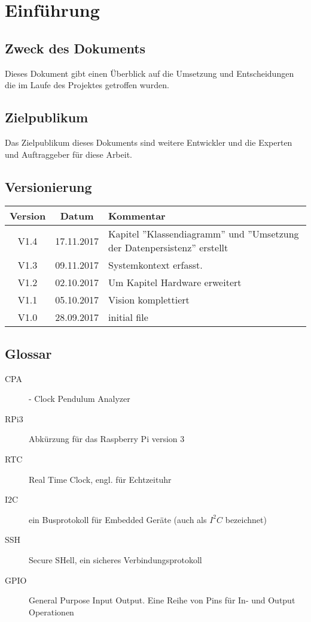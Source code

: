 \section{Einführung}
		\subsection{Zweck des Dokuments}
            Dieses Dokument gibt einen Überblick auf die Umsetzung und Entscheidungen die im Laufe des Projektes getroffen wurden.
		\subsection{Zielpublikum}
            Das Zielpublikum dieses Dokuments sind weitere Entwickler und die Experten und Auftraggeber für diese Arbeit.
		\subsection{Versionierung}
			\begin{table}[h]
				\centering
				\begin{tabularx}{\textwidth}{|c|c|X|}
				\hline
				\rowcolor{shadecolor}\textbf{Version} & \textbf{Datum} & \textbf{Kommentar}\\ \hline
                V1.4 & 17.11.2017 & Kapitel ''Klassendiagramm'' und ''Umsetzung der Datenpersistenz'' erstellt\\ \hline
                V1.3 & 09.11.2017 & Systemkontext erfasst.\\ \hline
                V1.2 & 02.10.2017 & Um Kapitel Hardware erweitert \\ \hline
        		V1.1 & 05.10.2017 & Vision komplettiert \\ \hline
				V1.0 & 28.09.2017 & initial file \\ \hline
				\end{tabularx}
			\end{table}
		\subsection{Glossar}
			\begin{description}
				\item[CPA]- Clock Pendulum Analyzer
                \item[RPi3] Abkürzung für das Raspberry Pi version 3
                \item[RTC] Real Time Clock, engl. für Echtzeituhr
                \item[I2C] ein Busprotokoll für Embedded Geräte (auch als $I^2C$ bezeichnet)
                \item[SSH] Secure SHell, ein sicheres Verbindungsprotokoll
                \item[GPIO] General Purpose Input Output. Eine Reihe von Pins für In- und Output Operationen
			\end{description}